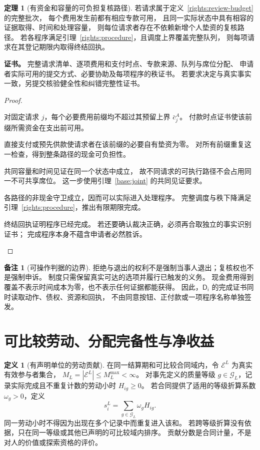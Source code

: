 \documentclass[UTF8,12pt,a4paper,openany,fontset=none,zihao=false]{ctexrep}
\theoremstyle{definition}
\newtheorem{definition}{定义}[chapter]
\newtheorem{theorem}{定理}[chapter]
\newtheorem{remark}{备注}[chapter]
\newenvironment{certificate}{\par\noindent\textbf{证书。}\ignorespaces}{\par}
\newcommand{\1}{\mathbf 1}
\begin{document}
\begin{theorem}[有资金和容量的可负担复核路径]
\label{rights:affordable-review}
若请求属于定义~\ref{rights:review-budget} 的完整批次，
每个费用发生前都有相应专款可用，
且同一实际状态中具有相容的证据取得、时间和处理容量，
则每位请求者存在不依赖新增个人垫资的复核路径。
若各程序满足引理~\ref{rights:procedure}，且调度上界覆盖完整队列，
则每项请求在其登记期限内取得终结回执。
\end{theorem}
\begin{certificate}
完整请求清单、逐项费用和支付时点、专款来源、队列与席位分配、
申请者实际可用的提交方式、必要协助及每项程序的秩证书。
若要求决定与真实事实一致，另提交核验健全性和纠错完整性证书。
\end{certificate}
\begin{proof}
\begin{semanticsteps}
\item 对固定请求 \(j\)，每个必要费用前缀均不超过其预留上界 \(\bar c_j^A\)。
付款时点证书使该前缀所需资金在支出前可用。
\item 直接支付或预先供款使请求者在该前缀的必要自有垫资为零。
对所有前缀重复这一检查，得到整条路径的现金可负担性。
\item 共同容量和时间见证在同一个状态中成立，
故不同请求的可执行路径不会占用同一不可共享席位。
这一步使用引理~\ref{base:joint} 的共同见证要求。
\item 各路径的非现金守卫成立，因而可以实际进入处理程序。
完整调度与秩下降满足引理~\ref{rights:procedure}，推出有限期限完成。
\item 终结回执证明程序已经完成。
若还要确认裁决正确，必须再合取独立的事实识别证书；
完成程序本身不蕴含申请者必然胜诉。
\end{semanticsteps}
\end{proof}

\begin{remark}[可操作判据的边界]
拒绝与退出的权利不是强制当事人退出；复核权也不是强制申诉。
制度只需保留真实可达的选项并履行已触发的义务。
现金费用得到覆盖不表示时间成本为零，也不表示任何证据都能获得。
因此，\(\mathsf D_i\) 的完成证书同时读取动作、债权、资源和回执，
不由同意按钮、正付款或一项程序名称单独签发。
\end{remark}

\section{可比较劳动、分配完备性与净收益}

\begin{definition}[有声明单位的劳动贡献]
\label{rights:comparable-labour}
在同一结算期和可比较合同域内，令 \(\mathcal E^L\) 为真实有效参与者集合，
\(M_L=|\mathcal E^L|\le M_L^{\max}<\infty\)。
对事先定义的质量等级 \(g\in\mathcal G_L\)，记录实际完成且不重复计数的劳动小时 \(H_{ig}\ge0\)。
若合同提供了适用的等级折算系数 \(\omega_g>0\)，定义
\[
s_i^L=\sum_{g\in\mathcal G_L}\omega_g H_{ig}.
\]
同一劳动小时不得因为出现在多个记录中而重复进入该和。
若跨等级折算没有依据，只在同一等级或其他已声明的可比较域内排序。
贡献分数是合同计量，不是对人的价值或探索资格的评价。
\end{definition}
\end{document}
